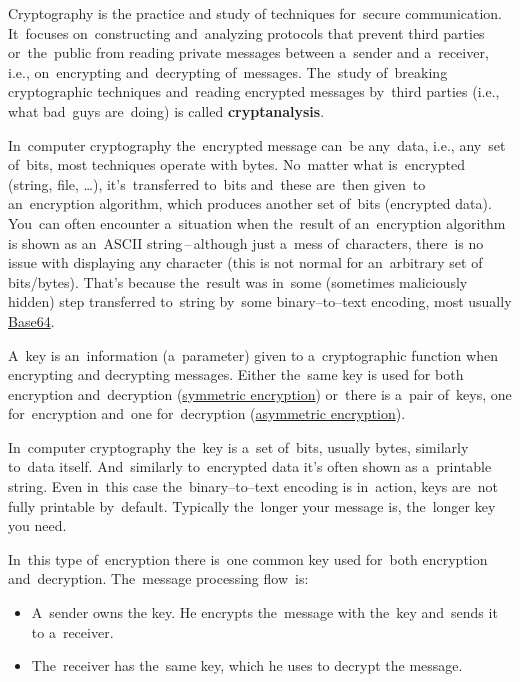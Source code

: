 Cryptography is the practice and study of techniques for~secure communication. It~focuses on~constructing and~analyzing protocols that prevent third parties or~the~public from reading private messages between a~sender and a~receiver, i.e., on~encrypting and~decrypting of~messages. The~study of~breaking cryptographic techniques and~reading encrypted messages by~third parties (i.e., what bad~guys are~doing) is called \textbf{cryptanalysis}.

In~computer cryptography the~encrypted message can~be any~data, i.e., any~set of~bits, most techniques operate with bytes. No~matter what is~encrypted (string, file, \dots), it's~transferred to~bits and~these are~then given~to an~encryption algorithm, which produces another set of~bits (encrypted data). You~can often encounter a~situation when the~result of an~encryption algorithm is shown as an~ASCII string\,--\,although just a~mess of~characters, there~is no issue with displaying any character (this is not normal for an~arbitrary set of bits/bytes). That's because the~result was in~some (sometimes maliciously hidden) step transferred to~string by~some binary--to--text encoding, most usually \hyperref[base64]{Base64}.

A~key is an~information (a~parameter) given to a~cryptographic function when encrypting and decrypting messages. Either the~same key is used for both encryption and~decryption (\hyperref[symmetricencryption]{symmetric encryption}) or~there is a~pair of~keys, one for~encryption and~one for~decryption (\hyperref[asymmetricencryption]{asymmetric encryption}).

In~computer cryptography the~key is a~set of~bits, usually bytes, similarly to~data itself. And~similarly to~encrypted data it's often shown as a~printable string. Even in~this case the~binary--to--text encoding is in~action, keys are~not fully printable by~default. Typically the~longer your message is, the~longer key you need.

\label{symmetricencryption}
In~this type of~encryption there is~one common key used for~both encryption and~decryption. The~message processing flow~is:
\begin{itemize}
    \item A~sender owns the key. He encrypts the~message with the~key and~sends it to a~receiver.
    \item The~receiver has the~same key, which he uses to decrypt the message.
\end{itemize}

